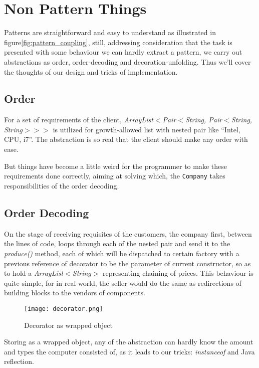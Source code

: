 \documentclass[a4paper]{article}
\begin{document}
\section{Non Pattern Things}%
\label{sec:non_pattern_things}

Patterns are straightforward and easy to understand
as illustrated in figure\ref{fig:pattern_coupling}, still,
addressing consideration that the task is presented with some behaviour we can hardly
extract a pattern, we carry out abstractions as order, order-decoding
and decoration-unfolding. Thus we'll cover the thoughts of our design and
tricks of implementation.

\subsection{Order}%
\label{sub:order}

For a set of requirements of the client, \textsl{ArrayList$<$Pair$<$String, Pair$<$String, String$>>>$}
is utilized for growth-allowed list with nested pair like ``Intel, CPU, i7''.
The abstraction is so real that the client should make any order with ease.


But things have become a little weird for the programmer to
make these requirements done correctly, aiming at solving which,
the \texttt{Company} takes responsibilities of the order decoding.

\subsection{Order Decoding}%
\label{sub:order_decoding}

On the stage of receiving requisites of the customers,
the company first,
between the lines of code,
loops through each of the nested pair
and send it to the \textsl{produce()} method,
each of which will be dispatched to certain factory with
a previous reference of decorator to be the parameter of
current constructor, so as to hold a \textsl{ArrayList$<$String$>$}
representing chaining of prices. This behaviour is
quite simple, for in real-world, the seller would do the same
as redirections of building blocks to the vendors of components.

\begin{figure}[h]
    \centering
    \texttt{[image: decorator.png]}
    \caption{Decorator as wrapped object}
    \label{fig:decorator}
\end{figure}

Storing as a wrapped object, any of the abstraction can hardly
know the amount and types the computer consisted of, as it leads
to our tricks: \textsl{instanceof} and Java reflection.
\end{document}

